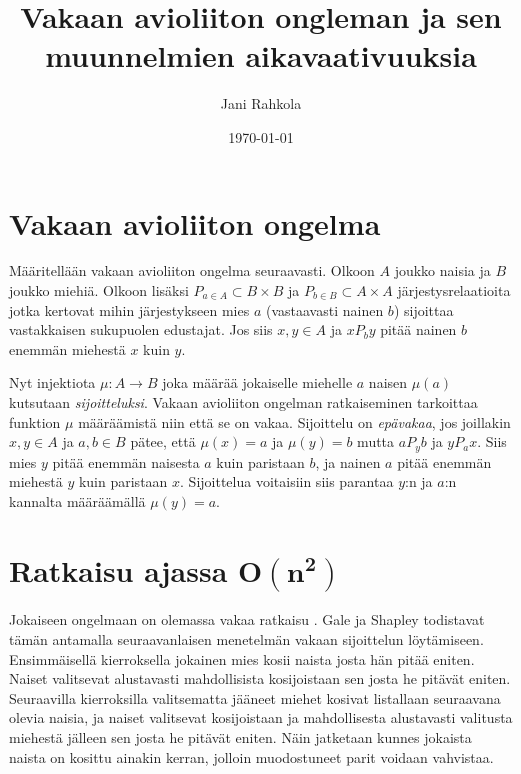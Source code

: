 \documentclass[gradu, twoside]{tktltiki}
\begin{document}
\title{Vakaan avioliiton ongleman ja sen muunnelmien aikavaativuuksia}
\author{Jani Rahkola}
\date{\today}
\level{}

\maketitle

\doublespacing

\subject{Tietojenkäsittelytiede}

\mytableofcontents

\section{Vakaan avioliiton ongelma}

Määritellään vakaan avioliiton ongelma seuraavasti. Olkoon $A$
joukko naisia ja $B$ joukko miehiä. Olkoon lisäksi $P_{a \in A}
\subset B \times B$ ja $P_{b \in B} \subset A \times A$
järjestysrelaatioita jotka kertovat mihin järjestykseen mies $a$
(vastaavasti nainen $b$) sijoittaa vastakkaisen sukupuolen
edustajat. Jos siis $x,y \in A$ ja $xP_by$ pitää nainen $b$
enemmän miehestä $x$ kuin $y$.

Nyt injektiota $\mu : A \rightarrow B$ joka määrää jokaiselle
miehelle $a$ naisen $\mu(a)$ kutsutaan \emph{sijoitteluksi}.
Vakaan avioliiton ongelman ratkaiseminen tarkoittaa funktion $\mu$
määräämistä niin että se on vakaa. Sijoittelu on \emph{epävakaa}, jos
joillakin $x, y \in A$ ja $a, b \in B$ pätee, että $\mu(x) = a$
ja $\mu(y) = b$ mutta $aP_yb$ ja $yP_ax$. Siis mies $y$ pitää
enemmän naisesta $a$ kuin paristaan $b$, ja nainen $a$ pitää
enemmän miehestä $y$ kuin paristaan $x$. Sijoittelua voitaisiin
siis parantaa $y$:n ja $a$:n kannalta määräämällä $\mu(y) = a$.

\section{Ratkaisu ajassa $\boldsymbol{O(n^2)}$}

Jokaiseen ongelmaan on olemassa vakaa ratkaisu \cite{galeshapley62}.
Gale ja Shapley todistavat tämän antamalla seuraavanlaisen menetelmän
vakaan sijoittelun löytämiseen. Ensimmäisellä kierroksella jokainen
mies kosii naista josta hän pitää eniten. Naiset valitsevat
alustavasti mahdollisista kosijoistaan sen josta he pitävät eniten.
Seuraavilla kierroksilla valitsematta jääneet miehet kosivat
listallaan seuraavana olevia naisia, ja naiset valitsevat kosijoistaan
ja mahdollisesta alustavasti valitusta miehestä jälleen sen josta he
pitävät eniten. Näin jatketaan kunnes jokaista naista on kosittu
ainakin kerran, jolloin muodostuneet parit voidaan vahvistaa.
\end{document}
